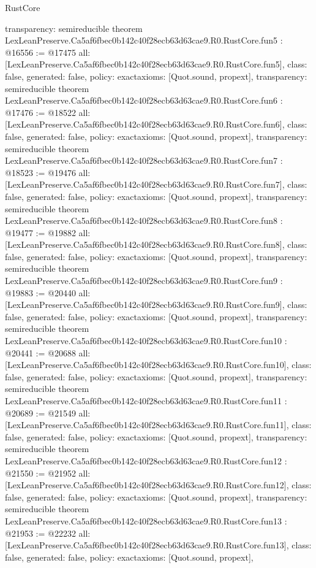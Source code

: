 \begin{lexlean}{RustCore}
\begin{coremodule}
{  transparency: semireducible
}
theorem LexLeanPreserve.Ca5af6fbec0b142c40f28ecb63d63cae9.R0.RustCore.fun5 : @16556 := @17475 {
  all: [LexLeanPreserve.Ca5af6fbec0b142c40f28ecb63d63cae9.R0.RustCore.fun5],
  class: false,
  generated: false,
  policy: exact{axioms: [Quot.sound, propext]},
  transparency: semireducible
}
theorem LexLeanPreserve.Ca5af6fbec0b142c40f28ecb63d63cae9.R0.RustCore.fun6 : @17476 := @18522 {
  all: [LexLeanPreserve.Ca5af6fbec0b142c40f28ecb63d63cae9.R0.RustCore.fun6],
  class: false,
  generated: false,
  policy: exact{axioms: [Quot.sound, propext]},
  transparency: semireducible
}
theorem LexLeanPreserve.Ca5af6fbec0b142c40f28ecb63d63cae9.R0.RustCore.fun7 : @18523 := @19476 {
  all: [LexLeanPreserve.Ca5af6fbec0b142c40f28ecb63d63cae9.R0.RustCore.fun7],
  class: false,
  generated: false,
  policy: exact{axioms: [Quot.sound, propext]},
  transparency: semireducible
}
theorem LexLeanPreserve.Ca5af6fbec0b142c40f28ecb63d63cae9.R0.RustCore.fun8 : @19477 := @19882 {
  all: [LexLeanPreserve.Ca5af6fbec0b142c40f28ecb63d63cae9.R0.RustCore.fun8],
  class: false,
  generated: false,
  policy: exact{axioms: [Quot.sound, propext]},
  transparency: semireducible
}
theorem LexLeanPreserve.Ca5af6fbec0b142c40f28ecb63d63cae9.R0.RustCore.fun9 : @19883 := @20440 {
  all: [LexLeanPreserve.Ca5af6fbec0b142c40f28ecb63d63cae9.R0.RustCore.fun9],
  class: false,
  generated: false,
  policy: exact{axioms: [Quot.sound, propext]},
  transparency: semireducible
}
theorem LexLeanPreserve.Ca5af6fbec0b142c40f28ecb63d63cae9.R0.RustCore.fun10 : @20441 := @20688 {
  all: [LexLeanPreserve.Ca5af6fbec0b142c40f28ecb63d63cae9.R0.RustCore.fun10],
  class: false,
  generated: false,
  policy: exact{axioms: [Quot.sound, propext]},
  transparency: semireducible
}
theorem LexLeanPreserve.Ca5af6fbec0b142c40f28ecb63d63cae9.R0.RustCore.fun11 : @20689 := @21549 {
  all: [LexLeanPreserve.Ca5af6fbec0b142c40f28ecb63d63cae9.R0.RustCore.fun11],
  class: false,
  generated: false,
  policy: exact{axioms: [Quot.sound, propext]},
  transparency: semireducible
}
theorem LexLeanPreserve.Ca5af6fbec0b142c40f28ecb63d63cae9.R0.RustCore.fun12 : @21550 := @21952 {
  all: [LexLeanPreserve.Ca5af6fbec0b142c40f28ecb63d63cae9.R0.RustCore.fun12],
  class: false,
  generated: false,
  policy: exact{axioms: [Quot.sound, propext]},
  transparency: semireducible
}
theorem LexLeanPreserve.Ca5af6fbec0b142c40f28ecb63d63cae9.R0.RustCore.fun13 : @21953 := @22232 {
  all: [LexLeanPreserve.Ca5af6fbec0b142c40f28ecb63d63cae9.R0.RustCore.fun13],
  class: false,
  generated: false,
  policy: exact{axioms: [Quot.sound, propext]},
}
\end{coremodule}
\end{lexlean}
